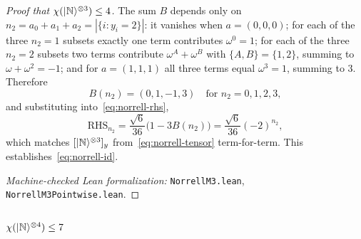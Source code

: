 \documentclass[11pt]{article}
\theoremstyle{definition}
\newcommand{\microspace}{\mspace{0.5mu}}
\newcommand{\ket}[1]{\lvert\microspace #1 \microspace \rangle}
\newcommand{\chiR}{\chi}
\newcommand{\Norrell}{\ket{\mathbb{N}}}
\begin{document}
\begin{proof}[Proof that $\chiR(\Norrell^{\otimes 3}) \le 4$]
		The sum $B$ depends only on $n_2 = a_0 + a_1 + a_2 = |\{i : y_i = 2\}|$:
		it vanishes when $a = (0,0,0)$; for each of the three
		$n_2 = 1$ subsets exactly one term contributes $\omega^0 = 1$; for
		each of the three $n_2 = 2$ subsets two terms contribute
		$\omega^A + \omega^B$ with $\{A, B\} = \{1, 2\}$, summing to
		$\omega + \omega^2 = -1$; and for $a = (1,1,1)$ all three terms
		equal $\omega^3 = 1$, summing to $3$. Therefore
		\begin{equation}
			B(n_2) = (0, 1, -1, 3) \quad \text{for } n_2 = 0, 1, 2, 3,
		\end{equation}
		and substituting into~\eqref{eq:norrell-rhs},
		\begin{equation}\label{eq:norrell-rhs-collapsed}
			\text{RHS}_{n_2} = \frac{\sqrt 6}{36} \big( 1 - 3 B(n_2) \big)
			= \frac{\sqrt 6}{36}  (-2)^{n_2},
		\end{equation}
		which matches $[\Norrell^{\otimes 3}]_y$ from~\eqref{eq:norrell-tensor}
		term-for-term. This establishes~\eqref{eq:norrell-id}.

		\textit{Machine-checked Lean formalization:}
		\texttt{NorrellM3.lean},
		\texttt{NorrellM3Pointwise.lean}.
	\end{proof}
	
	\subsubsection{\texorpdfstring{$\chiR(\Norrell^{\otimes 4}) \le 7$}{chi(N tensor 4) <= 7}}\label{app:norrell-m4}
	
\end{document}
